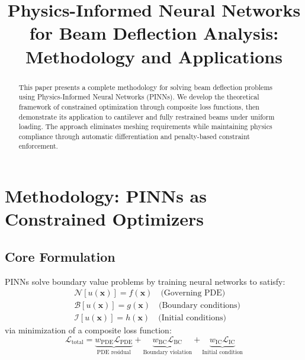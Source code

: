 \documentclass[12pt]{article}
\title{Physics-Informed Neural Networks for Beam Deflection Analysis: Methodology and Applications}
\author{}
\date{}
\begin{document}
\maketitle

\begin{abstract}
This paper presents a complete methodology for solving beam deflection problems using Physics-Informed Neural Networks (PINNs). We develop the theoretical framework of constrained optimization through composite loss functions, then demonstrate its application to cantilever and fully restrained beams under uniform loading. The approach eliminates meshing requirements while maintaining physics compliance through automatic differentiation and penalty-based constraint enforcement.
\end{abstract}

\section{Methodology: PINNs as Constrained Optimizers}
\subsection{Core Formulation}
PINNs solve boundary value problems by training neural networks to satisfy:
\begin{align}
&\mathcal{N}[u(\mathbf{x})] = f(\mathbf{x}) \quad \text{(Governing PDE)} \nonumber \\
&\mathcal{B}[u(\mathbf{x})] = g(\mathbf{x}) \quad \text{(Boundary conditions)} \nonumber \\
&\mathcal{I}[u(\mathbf{x})] = h(\mathbf{x}) \quad \text{(Initial conditions)} \nonumber
\end{align}
via minimization of a composite loss function:
\begin{equation}
\mathcal{L}_{\text{total}} = \underbrace{w_{\text{PDE}} \mathcal{L}_{\text{PDE}}}_{\text{PDE residual}} + 
\underbrace{w_{\text{BC}} \mathcal{L}_{\text{BC}}}_{\text{Boundary violation}} + 
\underbrace{w_{\text{IC}} \mathcal{L}_{\text{IC}}}_{\text{Initial condition}}
\label{eq:total_loss}
\end{equation}
\end{document}
